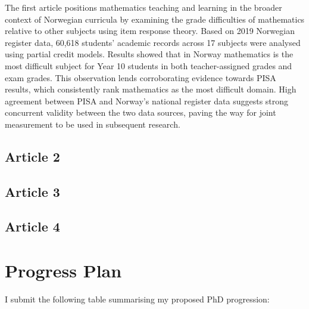 \documentclass[
    a4paper,                %
    11pt,                   %
    stu,                    %
    donotrepeattitle,       %
    floatsintext,           %
    biblatex,               %
    colorlinks=true,        %
    linkcolor=red,          %
    anchorcolor=black,      %
    citecolor=blue,         %
    urlcolor=blue,          %
    bookmarks=true,         %
    bookmarksopen=false,    %
    bookmarksnumbered=true, %
    dvipsnames              %
]{apa7}
\begin{document}
The first article positions mathematics teaching and learning in the broader context of Norwegian curricula by examining the grade difficulties of mathematics relative to other subjects using item response theory. Based on 2019 Norwegian register data, 60,618 students' academic records across 17 subjects were analysed using partial credit models. Results showed that in Norway mathematics is the most difficult subject for Year 10 students in both teacher-assigned grades and exam grades. This observation lends corroborating evidence towards PISA results, which consistently rank mathematics as the most difficult domain. High agreement between PISA and Norway's national register data suggests strong concurrent validity between the two data sources, paving the way for joint measurement to be used in subsequent research.

\subsection{Article 2}

\subsection{Article 3}

\subsection{Article 4}

\section{Progress Plan}

I submit the following table summarising my proposed PhD progression:
\end{document}
